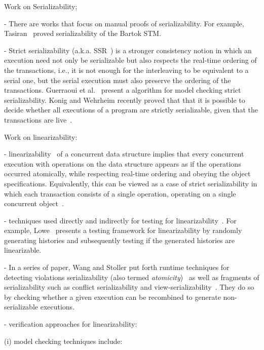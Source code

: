 
Work on Serializability;

- There are works that focus on manual proofs of serializability. For example, Tasiran~\cite{Ta08} proved serializability of the Bartok STM.

- Strict serializability (a.k.a. SSR~\cite{Pa79}) is a stronger consistency notion in which an execution need not only be serializable but also respects the real-time ordering of the transactions, i.e., it is not enough for the interleaving to be equivalent to a serial one, but the serial execution must also preserve the ordering of the transactions.
%
Guerraoui et al.~\cite{GuHeJoSi08} present a algorithm for model checking strict serializability.
%
Konig and Wehrheim recently proved that that it is possible to decide whether all executions of a program are strictly serializable, given that the transactions are live~\cite{KoWe21}.


Work on linearizability:

- linearizability~\cite{HeWi90} of a concurrent data structure implies that every concurrent execution with operations on the data structure appears as if the operations occurred atomically, while respecting real-time ordering and obeying the object specifications. 
%
Equivalently, this can be viewed as a case of strict serializability in which each transaction consists of a single operation, operating on a single concurrent object~\cite{WaSt06a}.




- techniques used directly and indirectly for testing for linearizability~\cite{PrGr12, PrGr13, WiGo93}. For example, Lowe~\cite{Lo17} presents a testing framework for linearizability by randomly generating histories and subsequently testing if the generated histories are linearizable.

- In a series of paper, Wang and Stoller put forth runtime techniques for detecting violations serializability (also termed \textit{atomicity})~\cite{WaSt06a} as well as fragments of serializability such as conflict serializability and view-serializability~\cite{WaSt06b}. They do so by  checking whether a given execution can be recombined to generate non-serializable executions.





- verification approaches for linearizability:



(i) model checking techniques include:

